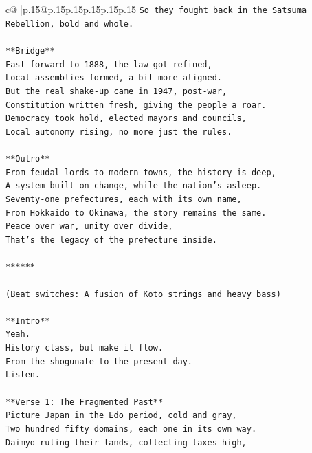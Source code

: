 \documentclass{article}
\begin{document}
{\begin{supertabular}{c@{$\;$}|p{.15\linewidth}@{}p{.15\linewidth}p{.15\linewidth}p{.15\linewidth}p{.15\linewidth}p{.15\linewidth}}
{{{\texttt{So they fought back in the Satsuma Rebellion, bold and whole.} \\
\\ 
\texttt{**Bridge**} \\
\texttt{Fast forward to 1888, the law got refined,} \\
\texttt{Local assemblies formed, a bit more aligned.} \\
\texttt{But the real shake{-}up came in 1947, post{-}war,} \\
\texttt{Constitution written fresh, giving the people a roar.} \\
\texttt{Democracy took hold, elected mayors and councils,} \\
\texttt{Local autonomy rising, no more just the rules.} \\
\\ 
\texttt{**Outro**} \\
\texttt{From feudal lords to modern towns, the history is deep,} \\
\texttt{A system built on change, while the nation's asleep.} \\
\texttt{Seventy{-}one prefectures, each with its own name,} \\
\texttt{From Hokkaido to Okinawa, the story remains the same.} \\
\texttt{Peace over war, unity over divide,} \\
\texttt{That's the legacy of the prefecture inside.} \\
\\ 
\texttt{******} \\
\\ 
\texttt{(Beat switches: A fusion of Koto strings and heavy bass)} \\
\\ 
\texttt{**Intro**} \\
\texttt{Yeah.} \\
\texttt{History class, but make it flow.} \\
\texttt{From the shogunate to the present day.} \\
\texttt{Listen.} \\
\\ 
\texttt{**Verse 1: The Fragmented Past**} \\
\texttt{Picture Japan in the Edo period, cold and gray,} \\
\texttt{Two hundred fifty domains, each one in its own way.} \\
\texttt{Daimyo ruling their lands, collecting taxes high,} \\
}}}
\end{supertabular}}
\end{document}
